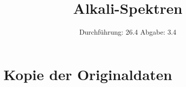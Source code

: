 

\subject{V605}
\title{Alkali-Spektren}
\date{
  Durchführung: 26.4
  \hspace{3em}
  Abgabe: 3.4
}



\maketitle
\thispagestyle{empty}
\tableofcontents
\newpage






\printbibliography

\appendix
\section{Kopie der Originaldaten}


